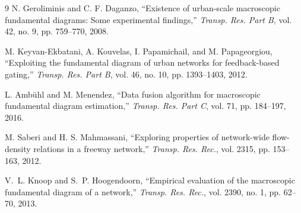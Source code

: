 \documentclass[lettersize,journal]{IEEEtran}
\begin{document}
\begin{thebibliography}{9}
N. Geroliminis and C. F. Daganzo, ``Existence of urban-scale macroscopic fundamental diagrams: Some experimental findings,'' \emph{Transp. Res. Part B}, vol. 42, no. 9, pp. 759--770, 2008.

M. Keyvan-Ekbatani, A. Kouvelas, I. Papamichail, and M. Papageorgiou, ``Exploiting the fundamental diagram of urban networks for feedback-based gating,'' \emph{Transp. Res. Part B}, vol. 46, no. 10, pp. 1393--1403, 2012.

L. Amb{\"u}hl and M. Menendez, ``Data fusion algorithm for macroscopic fundamental diagram estimation,'' \emph{Transp. Res. Part C}, vol. 71, pp. 184--197, 2016.

M. Saberi and H. S. Mahmassani, ``Exploring properties of network-wide flow-density relations in a freeway network,'' \emph{Transp. Res. Rec.}, vol. 2315, pp. 153--163, 2012.

V.~L. Knoop and S.~P. Hoogendoorn, ``Empirical evaluation of the macroscopic fundamental diagram of a network,'' \emph{Transp. Res. Rec.}, vol. 2390, no. 1, pp. 62--70, 2013.
\end{thebibliography}
\end{document}
